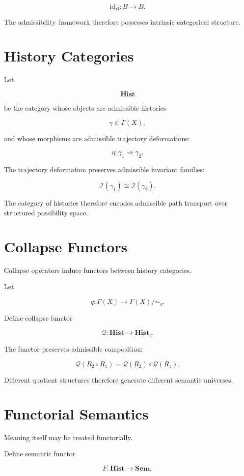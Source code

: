 \documentclass[12pt,openany]{book}
\theoremstyle{plain}
\theoremstyle{definition}
\theoremstyle{remark}
\begin{document}
\[
\mathrm{id}_B :
B \to B.
\]

The admissibility framework therefore possesses intrinsic
categorical structure.

\section{History Categories}

Let

\[
\mathbf{Hist}
\]

be the category whose objects are admissible histories

\[
\gamma
\in
\Gamma(X),
\]

and whose morphisms are admissible trajectory deformations:

\[
\eta :
\gamma_1 \Rightarrow \gamma_2.
\]

The trajectory deformation preserves admissible invariant
families:

\[
\mathcal{I}(\gamma_1)
\cong
\mathcal{I}(\gamma_2).
\]

The category of histories therefore encodes admissible path
transport over structured possibility space.

\section{Collapse Functors}

Collapse operators induce functors between history categories.

Let

\[
q :
\Gamma(X)
\to
\Gamma(X)/{\sim_q}.
\]

Define collapse functor

\[
\mathcal{Q} :
\mathbf{Hist}
\to
\mathbf{Hist}_q.
\]

The functor preserves admissible composition:

\[
\mathcal{Q}(R_2\circ R_1)
=
\mathcal{Q}(R_2)\circ\mathcal{Q}(R_1).
\]

Different quotient structures therefore generate different
semantic universes.

\section{Functorial Semantics}

Meaning itself may be treated functorially.

Define semantic functor

\[
F :
\mathbf{Hist}
\to
\mathbf{Sem},
\]
\end{document}
